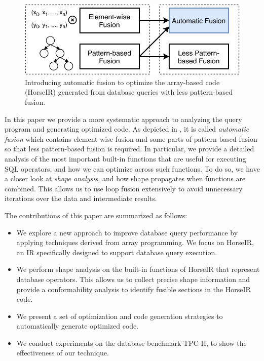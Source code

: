 \begin{figure}[htbp]
\centering
\includegraphics[width=.95\columnwidth]{./src/figure/basic-idea.pdf}
\caption{Introducing automatic fusion to optimize the array-based code
(HorseIR) generated from database queries with less pattern-based fusion.}
\label{fig:fusion_idea}
\end{figure}

In this paper we provide a more systematic approach to analyzing the query
program and generating optimized code.
As depicted in , it is called \textit{automatic fusion}
which contains element-wise fusion and some parts of pattern-based fusion so
that less pattern-based fusion is required.
In particular, we provide a detailed analysis of the most important built-in
functions that are useful for executing SQL operators, and how we can optimize
across such functions.
To do so, we have a closer look at \textit{shape analysis}, and how shape propagates
when functions are combined. This allows us to use loop fusion extensively to
avoid unnecessary iterations over the data and intermediate results.  


The contributions of this paper are summarized as follows:

\begin{itemize}
\item We explore a new approach to improve database query performance by
      applying techniques derived from array programming. We focus on HorseIR, an IR specifically designed to support database query execution.
\item We perform shape analysis on the built-in functions of HorseIR that represent database operators. This allows us to collect precise shape information and provide a conformability analysis to identify fusible sections in the HorseIR code. 
\item We present a set of optimization and code generation strategies to automatically
      generate optimized code.
\item We conduct experiments on the database benchmark TPC-H, to show the effectiveness of our technique.
\end{itemize}

